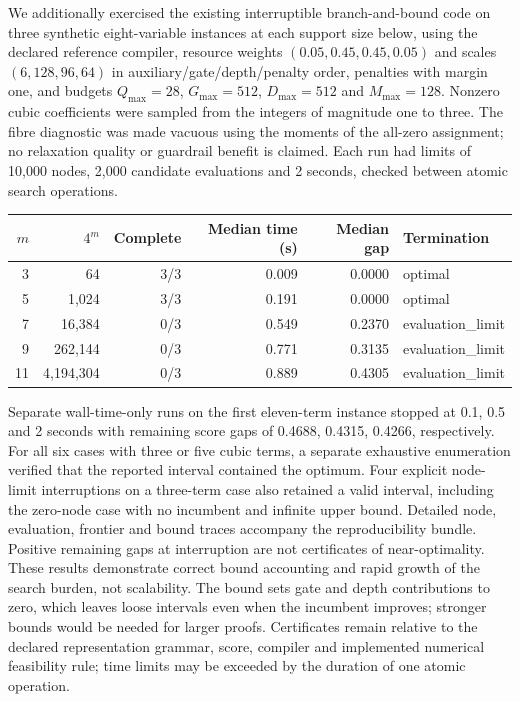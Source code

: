 \documentclass[a4paper,onecolumn,11pt,unpublished]{quantumarticle}
\theoremstyle{remark}
\begin{document}
We additionally exercised the existing interruptible branch-and-bound code on
three synthetic eight-variable instances at each support size below, using the
declared reference compiler, resource weights $(0.05,0.45,0.45,0.05)$ and
scales $(6,128,96,64)$ in auxiliary/gate/depth/penalty order, penalties with margin one, and
budgets $Q_{\max}=28$, $G_{\max}=512$, $D_{\max}=512$ and $M_{\max}=128$.
Nonzero cubic coefficients were sampled from the integers of magnitude one to three.
The fibre diagnostic was made
vacuous using the moments of the all-zero assignment; no relaxation quality or
guardrail benefit is claimed. Each run had limits of 10,000 nodes, 2,000 candidate
evaluations and 2 seconds, checked between atomic search operations.
\begin{center}\begin{tabular}{rrrrrl}
\toprule
$m$ & $4^m$ & Complete & Median time (s) & Median gap & Termination\\
\midrule
3 & 64 & 3/3 & 0.009 & 0.0000 & optimal\\
5 & 1,024 & 3/3 & 0.191 & 0.0000 & optimal\\
7 & 16,384 & 0/3 & 0.549 & 0.2370 & evaluation\_limit\\
9 & 262,144 & 0/3 & 0.771 & 0.3135 & evaluation\_limit\\
11 & 4,194,304 & 0/3 & 0.889 & 0.4305 & evaluation\_limit\\
\bottomrule\end{tabular}\end{center}
Separate wall-time-only runs on the first eleven-term instance stopped at
0.1, 0.5 and 2 seconds with remaining score gaps of 0.4688, 0.4315, 0.4266, respectively.
For all six cases with three or five cubic terms, a separate exhaustive enumeration
verified that the reported interval contained the optimum. Four explicit node-limit
interruptions on a three-term case also retained a valid interval, including the
zero-node case with no incumbent and infinite upper bound. Detailed node, evaluation,
frontier and bound traces accompany the reproducibility bundle. Positive remaining
gaps at interruption are not certificates of near-optimality. These results demonstrate
correct bound accounting and rapid growth of the search burden, not scalability.
The bound sets gate and depth contributions to zero, which leaves loose intervals
even when the incumbent improves; stronger bounds would be needed for larger proofs.
Certificates remain relative to the declared representation grammar, score, compiler
and implemented numerical feasibility rule; time limits may be exceeded by the duration
of one atomic operation.
\end{document}
